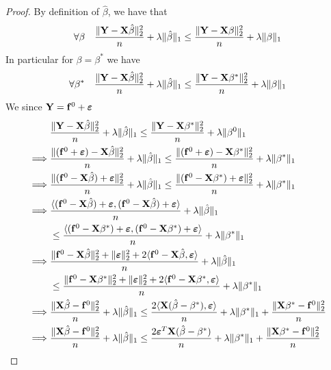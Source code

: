\begin{proof}
    By definition of $\hat \beta$, we have that
    $$
        \forall \beta \quad \frac{\| \mathbf{Y} -\mathbf{X} \hat \beta \|_{2}^{2}}{n} + \lambda \| \hat \beta \|_{1} \leq \frac{\|\mathbf{Y}-\mathbf{X} \beta \|_{2}^{2}}{n}+\lambda \| \beta \|_{1}
    $$
    In particular for $\beta = \beta^*$ we have
    $$
        \forall \beta^* \quad \frac{\| \mathbf{Y} -\mathbf{X} \hat \beta \|_{2}^{2}}{n} + \lambda \| \hat \beta \|_{1} \leq \frac{\|\mathbf{Y}-\mathbf{X} \beta^* \|_{2}^{2}}{n}+\lambda \| \beta \|_{1}
    $$
    We since $\mathbf{Y} = \mathbf{f}^0 + \boldsymbol{\varepsilon}$
    \begin{align*}
                 & \frac{\|\mathbf{Y}  - \mathbf{X} \hat{\beta} \|_{2}^{2}}{n} + \lambda \| \hat{\beta}\|_{1} \leq \frac{\| \mathbf{Y}  - \mathbf{X} \beta^* \|_2^2}{n}+\lambda\|\beta^{0}\|_{1}                                                                      \\
        \implies &
        \frac{\| (\mathbf{f}^0 + \boldsymbol{\varepsilon}) - \mathbf{X} \hat \beta \|_{2}^{2}}{n} + \lambda\| \hat \beta \|_{1} \leq \frac{ \| (\mathbf{f}^0 + \boldsymbol{\varepsilon})-\mathbf{X} \beta^*\|_{2}^{2}}{n}+\lambda \| \beta^*\|_{1}                                            \\
        \implies &
        \frac{\| (\mathbf{f}^0 - \mathbf{X} \hat \beta ) + \boldsymbol{\varepsilon} \|_{2}^{2}}{n} + \lambda\| \hat \beta \|_{1} \leq \frac{ \| (\mathbf{f}^0 - \mathbf{X} \beta^*) + \boldsymbol{\varepsilon} \|_{2}^{2}}{n}+\lambda \| \beta^*\|_{1}                                        \\
        \implies &
        \frac{\langle (\mathbf{f}^0 - \mathbf{X} \hat \beta ) + \boldsymbol{\varepsilon}, (\mathbf{f}^0 - \mathbf{X} \hat \beta ) + \boldsymbol{\varepsilon} \rangle}{n} + \lambda\| \hat \beta \|_{1}                                                                                        \\
                 & \leq \frac{ \langle (\mathbf{f}^0 - \mathbf{X} \beta^*) + \boldsymbol{\varepsilon}, (\mathbf{f}^0 - \mathbf{X} \beta^*) + \boldsymbol{\varepsilon} \rangle}{n}+\lambda \| \beta^*\|_{1}                                                                                    \\
        \implies &
        \frac{\|\mathbf{f}^0 - \mathbf{X} \hat \beta \|_{2}^{2} + \| \boldsymbol{\varepsilon} \|_{2}^{2} + 2\langle \mathbf{f}^0 - \mathbf{X} \hat \beta, \boldsymbol{\varepsilon} \rangle}{n} + \lambda\| \hat \beta \|_{1}                                                                  \\
                 & \leq \frac{\|\mathbf{f}^0 - \mathbf{X} \beta^* \|_{2}^{2} + \| \boldsymbol{\varepsilon} \|_{2}^{2} + 2\langle \mathbf{f}^0 - \mathbf{X} \beta^*, \boldsymbol{\varepsilon} \rangle}{n}+\lambda \| \beta^*\|_{1}                                                             \\
        \implies &
        \frac{\|\mathbf{X} \hat \beta - \mathbf{f}^0 \|_{2}^{2}}{n} + \lambda\| \hat \beta \|_{1} \leq \frac{2\langle \mathbf{X} (\hat\beta - \beta^*), \boldsymbol{\varepsilon} \rangle}{n} + \lambda \| \beta^*\|_{1} + \frac{\|\mathbf{X} \beta^* - \mathbf{f}^0\|_{2}^{2}}{n} \\
        \implies &
        \frac{\|\mathbf{X} \hat \beta - \mathbf{f}^0 \|_{2}^{2}}{n} + \lambda\| \hat \beta \|_{1} \leq \frac{2 \boldsymbol{\varepsilon}^T \mathbf{X} (\hat\beta - \beta^*)}{n} + \lambda \| \beta^*\|_{1} + \frac{\|\mathbf{X} \beta^* - \mathbf{f}^0\|_{2}^{2}}{n}               \\
    \end{align*}
\end{proof}

